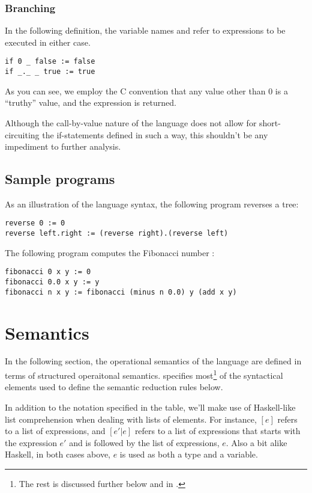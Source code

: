 \subsubsection{Branching}

In the following definition, the variable names  and 
refer to expressions to be executed in either case.

\begin{verbatim}
if 0 _ false := false
if _._ _ true := true
\end{verbatim}

As you can see, we employ the C convention that any value other than $0$ is a
``truthy'' value, and the expression  is returned.

Although the call-by-value nature of the language does not allow for
short-circuiting the if-statements defined in such a way, this shouldn't be any
impediment to further analysis.

\subsection{Sample programs}

As an illustration of the language syntax, the following program reverses a tree:

\begin{verbatim}
reverse 0 := 0
reverse left.right := (reverse right).(reverse left)
\end{verbatim}

The following program computes the Fibonacci number :

\begin{verbatim}
fibonacci 0 x y := 0
fibonacci 0.0 x y := y
fibonacci n x y := fibonacci (minus n 0.0) y (add x y)
\end{verbatim}

\section{Semantics}

In the following section, the operational semantics of the language 
are defined in terms of structured operaitonal semantics\cite{sos}.
 specifies most\footnote{The rest is discussed
further below and in .} of the
syntactical elements used to define the semantic reduction rules below.

In addition to the notation specified in the table, we'll make use of
Haskell-like list comprehension when dealing with lists of elements. For
instance, $[e]$ refers to a list of expressions, and $[e'|e]$ refers to a list
of expressions that starts with the expression $e'$ and is followed by the list
of expressions, $e$. Also a bit alike Haskell, in both cases above, $e$ is used
as both a type and a variable.


